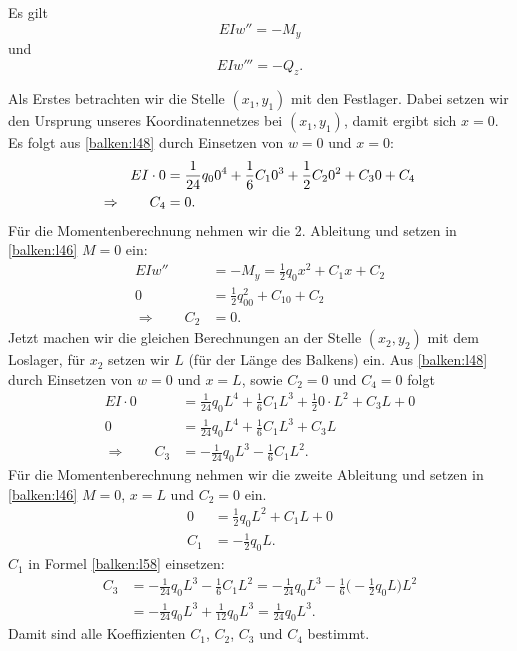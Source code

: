 Es gilt
\begin{equation*}
	EIw'' =
	-M_y
\end{equation*}
und
\begin{equation}
	EIw'''=
	-Q_z.
\label{balken:l1}
\end{equation}

Als Erstes betrachten wir die Stelle $(x_1, y_1)$ mit den Festlager.
Dabei setzen wir den Ursprung unseres Koordinatennetzes bei $(x_1, y_1)$, damit ergibt sich $x = 0$.
Es folgt aus \eqref{balken:l48} durch Einsetzen von $w = 0$ und $x = 0$:
\begin{align}
EI\cdot0
&=
	\frac{1}{24}q_00^4+\frac{1}{6}C_10^3+\frac{1}{2}C_20^2+C_30+C_4
\notag
\\
	\Rightarrow\qquad C_4&=
	0.
\label{balken:l58}
\end{align}
Für die Momentenberechnung nehmen wir die 2. Ableitung und setzen in
\eqref{balken:l46}
$M = 0$ ein:
\begin{align*}
EIw''&= -M_y= \frac{1}{2}q_0x^2+C_1x+C_2
\\
0&= \frac{1}{2}q_00^2+C_10+C_2
\\
\Rightarrow\qquad C_2&= 0.
\end{align*}
Jetzt machen wir die gleichen Berechnungen an der Stelle $(x_2, y_2)$ mit dem Loslager, für $x_2$ setzen wir $L$ (für der Länge des Balkens) ein.
Aus \eqref{balken:l48}
durch Einsetzen von $w = 0$ und $x = L$, sowie $C_2 = 0$ und $C_4 = 0$ folgt
\begin{align*}
	EI\cdot0&=
	\frac{1}{24}q_0L^4+\frac{1}{6}C_1L^3+\frac{1}{2}0\cdot L^2+C_3L+0
\\
	0&=
	\frac{1}{24}q_0L^4+\frac{1}{6}C_1L^3+C_3L
\\
	\Rightarrow\qquad C_3&=
	-\frac{1}{24}q_0L^3-\frac{1}{6}C_1L^2.
\end{align*}
Für die Momentenberechnung nehmen wir die zweite Ableitung und setzen in
\eqref{balken:l46}
$M = 0$, $x = L$ und $C_2 = 0$ ein.
\begin{align*}
		0 &=
		\frac{1}{2}q_0L^2+C_1L+0
    \\
		C_1&=
		-\frac{1}{2}q_0L.
\end{align*}
$C_1$ in Formel \eqref{balken:l58} einsetzen:
\begin{align*}
	C_3&=
	-\frac{1}{24}q_0L^3-\frac{1}{6}C_1L^2
	=	-\frac{1}{24}q_0L^3-\frac{1}{6}\biggl(-\frac{1}{2}q_0L\biggr)L^2
\\
	&=	-\frac{1}{24}q_0L^3+\frac{1}{12}q_0L^3
	=	\frac{1}{24}q_0L^3.
\end{align*}
Damit sind alle Koeffizienten $C_1$, $C_2$, $C_3$ und $C_4$ bestimmt.

